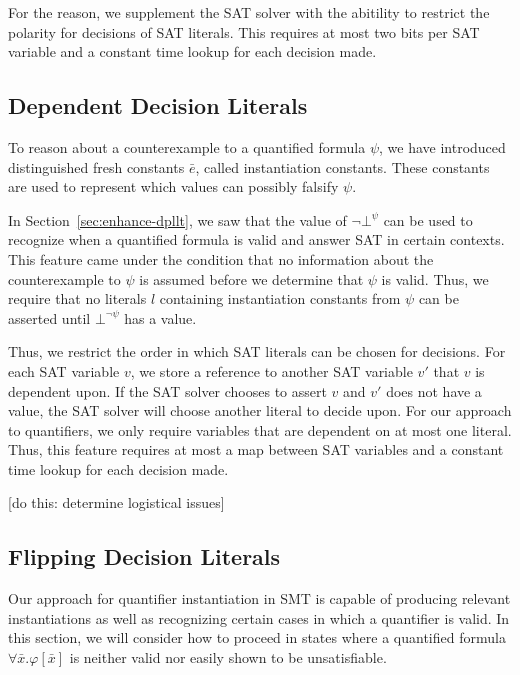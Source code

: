 \documentclass{llncs}
\begin{document}
For the reason, we supplement the SAT solver with the abitility to restrict the polarity for decisions of SAT literals.
This requires at most two bits per SAT variable and a constant time lookup for each decision made.

\subsection{Dependent Decision Literals}

To reason about a counterexample to a quantified formula $\psi$, we have introduced distinguished fresh constants $\bar{e}$, called instantiation constants.
These constants are used to represent which values can possibly falsify $\psi$.

In Section~\ref{sec:enhance-dpllt}, we saw that the value of $\neg \bot^\psi$ can be used to recognize when a quantified formula is valid and answer SAT in certain contexts.
This feature came under the condition that no information about the counterexample to $\psi$ is assumed before we determine that $\psi$ is valid.
Thus, we require that no literals $l$ containing instantiation constants from $\psi$ can be asserted until $\bot^{ \neg \psi }$ has a value.

Thus, we restrict the order in which SAT literals can be chosen for decisions.
For each SAT variable $v$, we store a reference to another SAT variable $v'$ that $v$ is dependent upon.
If the SAT solver chooses to assert $v$ and $v'$ does not have a value, the SAT solver will choose another literal to decide upon.
For our approach to quantifiers, we only require variables that are dependent on at most one literal.
Thus, this feature requires at most a map between SAT variables and a constant time lookup for each decision made.

[do this: determine logistical issues]

\subsection{Flipping Decision Literals}

Our approach for quantifier instantiation in SMT is capable of producing relevant instantiations as well as recognizing certain cases in which a quantifier is valid. 
In this section, we will consider how to proceed in states where a quantified formula $\forall \bar{x}. \varphi[ \bar{x} ]$ is neither valid nor easily shown to be unsatisfiable. \\
\end{document}
